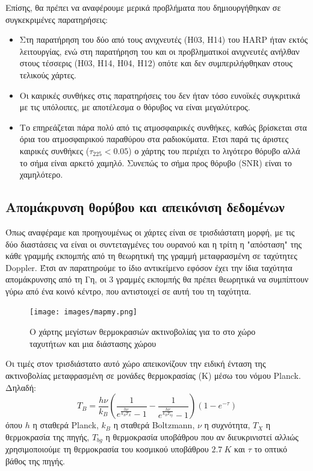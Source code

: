 \documentclass[a4paper,12pt]{memoir}
\begin{document}
Επίσης, θα πρέπει να αναφέρουμε μερικά προβλήματα που δημιουργήθηκαν σε συγκεκριμένες παρατηρήσεις:
\begin{itemize}
\item Στη παρατήρηση του  δύο από τους ανιχνευτές (H03, H14) του HARP ήταν εκτός λειτουργίας, ενώ στη παρατήρηση του  και  οι προβληματικοί ανιχνευτές ανήλθαν στους τέσσερις (H03, H14, H04, H12) οπότε και δεν συμπεριλήφθηκαν στους τελικούς χάρτες. 
\item Οι καιρικές συνθήκες στις παρατηρήσεις του  δεν ήταν τόσο ευνοϊκές συγκριτικά με τις υπόλοιπες, με αποτέλεσμα ο θόρυβος να είναι μεγαλύτερος.
\item Το  επηρεάζεται πάρα πολύ από τις ατμοσφαιρικές συνθήκες, καθώς βρίσκεται στα όρια του ατμοσφαιρικού παραθύρου στα ραδιοκύματα. Έτσι παρά τις άριστες καιρικές συνθήκες ($\tau _{225} <0.05$) ο χάρτης του  περιέχει το λιγότερο θόρυβο αλλά το σήμα είναι αρκετό χαμηλό. Συνεπώς το σήμα προς θόρυβο (SNR) είναι το χαμηλότερο.

\end{itemize}

\subsection{Απομάκρυνση θορύβου και απεικόνιση δεδομένων}
Όπως αναφέραμε και προηγουμένως οι χάρτες είναι σε τρισδιάστατη μορφή, με τις δύο διαστάσεις να είναι οι συντεταγμένες του ουρανού και η τρίτη η "απόσταση" της κάθε γραμμής εκπομπής από τη θεωρητική της γραμμή μεταφρασμένη σε ταχύτητες Doppler. Έτσι αν παρατηρούμε το ίδιο αντικείμενο εφόσον έχει την ίδια ταχύτητα απομάκρυνσης από τη Γη, οι 3 γραμμές εκπομπής θα πρέπει θεωρητικά να συμπίπτουν γύρω από ένα κοινό κέντρο, που αντιστοιχεί σε αυτή του τη ταχύτητα.

\begin{figure}
	\begin{flushright}
		\texttt{[image: images/mapmy.png]}
		\caption{Ο χάρτης μεγίστων θερμοκρασιών ακτινοβολίας για το  στο χώρο ταχυτήτων και μια διάστασης χώρου}
	\end{flushright}
\end{figure}


Οι τιμές στον τρισδιάστατο αυτό χώρο απεικονίζουν την ειδική ένταση της ακτινοβολίας μεταφρασμένη σε μονάδες θερμοκρασίας (K) μέσω του νόμου Planck. Δηλαδή:
\begin{equation}
\label{eq:TB}
T_B=\frac{h \nu}{k_B} \left( \frac{1}{e^{\frac{h \nu}{k_B T_X}}-1}-\frac{1}{e^{\frac{h \nu}{k_B T_{bg}}}-1} \right) \left( 1-e^{-\tau} \right) 
\end{equation}
όπου $h$ η σταθερά Planck, $k_B$ η σταθερά Boltzmann, $\nu$ η συχνότητα, $T_X$ η θερμοκρασία της πηγής, $T_{bg} $ η θερμοκρασία υποβάθρου που αν διευκρινιστεί αλλιώς χρησιμοποιούμε τη θερμοκρασία του κοσμικού υποβάθρου $2.7\ K$ και $\tau$ το οπτικό βάθος της πηγής.
\end{document}
